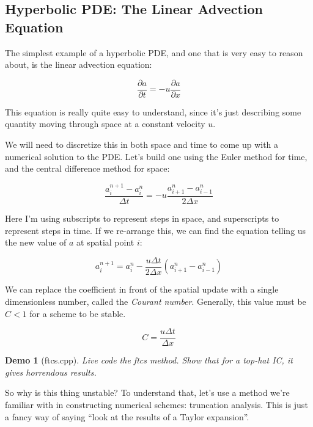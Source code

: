 \documentclass{article}
\theoremstyle{demo}
\newtheorem{demo}{Demo}[section]
\begin{document}
\subsection{Hyperbolic PDE: The Linear Advection Equation}
The simplest example of a hyperbolic PDE, and one that is very easy to reason
about, is the linear advection equation:

\begin{equation}
    \frac{\partial a}{\partial t} = -u\frac{\partial a}{\partial x}
\end{equation}

This equation is really quite easy to understand, since it's just describing
some quantity moving through space at a constant velocity $u$.

We will need to discretize this in both space and time to come up with a
numerical solution to the PDE.  Let's build one using the Euler method for time,
and the central difference method for space:

\begin{equation}
    \frac{a_i^{n+1} - a_i^n}{\Delta t} = -u\frac{a_{i+1}^n - a_{i-1}^n}{2\Delta
    x}
\end{equation}

Here I'm using subscripts to represent steps in space, and superscripts to
represent steps in time.  If we re-arrange this, we can find the equation
telling us the new value of $a$ at spatial point $i$:

\begin{equation}
    a_i^{n+1} = a_i^n - \frac{u\Delta t}{2\Delta x}(a_{i+1}^n - a_{i-1}^n)
\end{equation}

We can replace the coefficient in front of the spatial update with a single
dimensionless number, called the \textit{Courant number}.  Generally, this value
must be $C<1$ for a scheme to be stable.

\begin{equation}
    C = \frac{u\Delta t}{\Delta x}
\end{equation}

\begin{demo}[ftcs.cpp]
    Live code the ftcs method.  Show that for a top-hat IC, it gives horrendous
    results.
\end{demo}

So why is this thing unstable?  To understand that, let's use a method we're
familiar with in constructing numerical schemes: truncation analysis.  This is
just a fancy way of saying ``look at the results of a Taylor expansion''.
\end{document}

